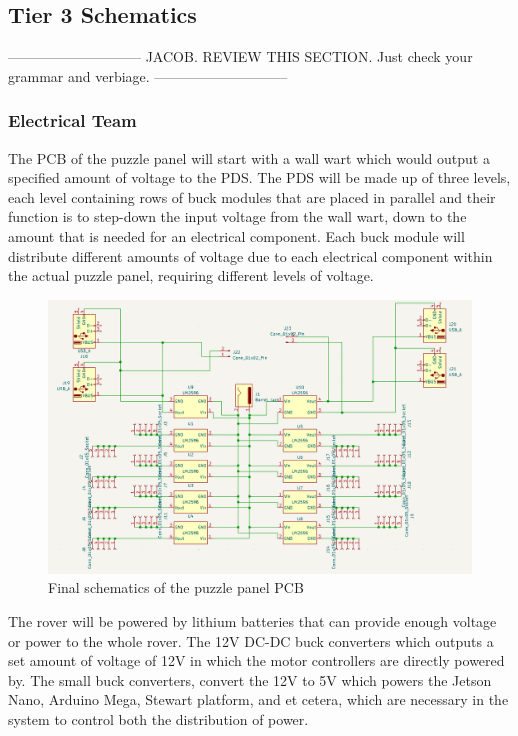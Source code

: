 \documentclass[a4paper, 10pt]{article}
\begin{document}
    \pagebreak
	\subsection{Tier 3 Schematics}
-----------------------------
JACOB. REVIEW THIS SECTION.	Just check your grammar and verbiage.
-----------------------------
		\subsubsection{Electrical Team}
		The PCB of the puzzle panel will start with a wall wart which would output a specified amount of voltage to the PDS. The PDS will be made up of three levels, each level containing rows of buck modules that are placed in parallel and their function is to step-down the input voltage from the wall wart, down to the amount that is needed for an electrical component. Each buck module will distribute different amounts of voltage due to each electrical component within the actual puzzle panel, requiring different levels of voltage.
		
		\begin{figure} [!h]
			\centering
			\includegraphics[scale=0.65]{Photos/Puzzle Panel schematic 1}
			\caption{Final schematics of the puzzle panel PCB}
			\label{puzzle_panel_PCB}
		\end{figure}

		The rover will be powered by lithium batteries that can provide enough voltage or power to the whole rover. The 12V DC-DC buck converters which outputs a set amount of voltage of 12V in which the motor controllers are directly powered by. The small buck converters, convert the 12V to 5V which powers the Jetson Nano, Arduino Mega, Stewart platform, and et cetera, which are necessary in the system to control both the distribution of power. 
		
\end{document}
